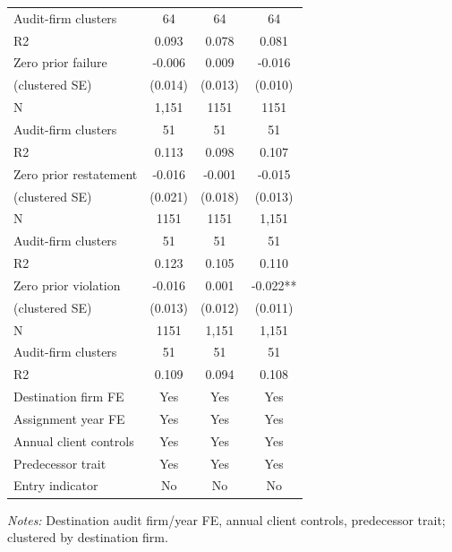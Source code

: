 \begin{table}[htbp]
\begin{threeparttable}
\begin{tabular}{p{}ccc}
Audit-firm clusters & 64 & 64 & 64 \\
R2 & 0.093 & 0.078 & 0.081 \\
Zero prior failure & -0.006 & 0.009 & -0.016 \\
(clustered SE) & (0.014) & (0.013) & (0.010) \\
N & 1,151 & 1151 & 1151 \\
Audit-firm clusters & 51 & 51 & 51 \\
R2 & 0.113 & 0.098 & 0.107 \\
Zero prior restatement & -0.016 & -0.001 & -0.015 \\
(clustered SE) & (0.021) & (0.018) & (0.013) \\
N & 1151 & 1151 & 1,151 \\
Audit-firm clusters & 51 & 51 & 51 \\
R2 & 0.123 & 0.105 & 0.110 \\
Zero prior violation & -0.016 & 0.001 & -0.022** \\
(clustered SE) & (0.013) & (0.012) & (0.011) \\
N & 1151 & 1,151 & 1,151 \\
Audit-firm clusters & 51 & 51 & 51 \\
R2 & 0.109 & 0.094 & 0.108 \\
Destination firm FE & Yes & Yes & Yes \\
Assignment year FE & Yes & Yes & Yes \\
Annual client controls & Yes & Yes & Yes \\
Predecessor trait & Yes & Yes & Yes \\
Entry indicator & No & No & No \\
\bottomrule
\end{tabular}
\begin{tablenotes}\footnotesize
\item \raggedright \textit{Notes:} Destination audit firm/year FE, annual client controls, predecessor trait; clustered by destination firm.
\end{tablenotes}
\end{threeparttable}
\end{table}
